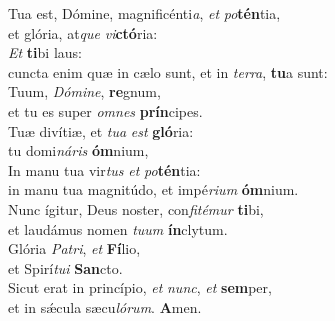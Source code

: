 \evenverse Tua est, Dómine, magnificénti\textit{a}, \textit{et} \textit{po}\textbf{tén}tia,~\*\\
\evenverse et glória, at\textit{que} \textit{vi}\textbf{ctó}ria:\\
\oddverse \textit{Et} \textbf{ti}bi laus:~\*\\
\oddverse cuncta enim quæ in cælo sunt, et in \textit{ter}\textit{ra}, \textbf{tu}a sunt:\\
\evenverse Tuum, \textit{Dó}\textit{mi}\textit{ne}, \textbf{re}gnum,~\*\\
\evenverse et tu es super \textit{om}\textit{nes} \textbf{prín}cipes.\\
\oddverse Tuæ divítiæ, et \textit{tu}\textit{a} \textit{est} \textbf{gló}ria:~\*\\
\oddverse tu domi\textit{ná}\textit{ris} \textbf{óm}nium,\\
\evenverse In manu tua vir\textit{tus} \textit{et} \textit{po}\textbf{tén}tia:~\*\\
\evenverse in manu tua magnitúdo, et impé\textit{ri}\textit{um} \textbf{óm}nium.\\
\oddverse Nunc ígitur, Deus noster, con\textit{fi}\textit{té}\textit{mur} \textbf{ti}bi,~\*\\
\oddverse et laudámus nomen \textit{tu}\textit{um} \textbf{ín}clytum.\\
\evenverse Glória \textit{Pa}\textit{tri}, \textit{et} \textbf{Fí}lio,~\*\\
\evenverse et Spirí\textit{tu}\textit{i} \textbf{San}cto.\\
\oddverse Sicut erat in princípio, \textit{et} \textit{nunc}, \textit{et} \textbf{sem}per,~\*\\
\oddverse et in sǽcula sæcu\textit{ló}\textit{rum}. \textbf{A}men.\\
